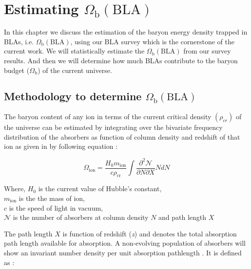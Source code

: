 \chapter{Estimating $\Omega_\text{b}(\text{BLA})$} \label{ch:Omega-b}

In this chapter we discuss the estimation of the baryon energy density trapped in BLAs, i.e. $\Omega_\text{b}(\text{BLA})$, using our BLA survey which is the cornerstone of the current work. We will statistically estimate the $\Omega_\text{b}(\text{BLA})$ from our survey results. And then we will determine how much BLAs contribute to the baryon budget ($\Omega_\text{b}$) of the current universe.

\section{Methodology to determine $\Omega_\text{b}(\text{BLA})$}

The baryon content of any ion in terms of the current critical density $(\rho_{cr})$ of the universe can be estimated by integrating over the bivariate frequency distribution of the absorbers as function of column density and redshift of that ion as given in \citet{Becker-2011} by following equation :

\begin{equation} \label{eqn:omega_ion}
    \Omega_{\text{ion}} = \frac{H_0 m_{\text{ion}}}{c \rho_{\text{cr}}} \int \frac{\partial ^2 \mathcal{N}}{\partial N \partial X} N dN 
\end{equation}

\vspace*{3mm}

Where, $H_0$ is the current value of Hubble's constant, \\ \hspace*{19mm}
$m_\text{ion}$ is the the mass of ion, \\ \hspace*{19mm}
$c$ is the speed of light in vacuum, \\ \hspace*{19mm}
$\mathcal{N}$ is the number of absorbers at column density $N$ and path length $X$

\newpage

The path length $X$ is function of redshift (\emph{z}) and denotes the total absorption path length available for absorption. A non-evolving population of absorbers will show an invariant number density per unit absorption pathlength \citep{Becker-2011}. It is defined as :

